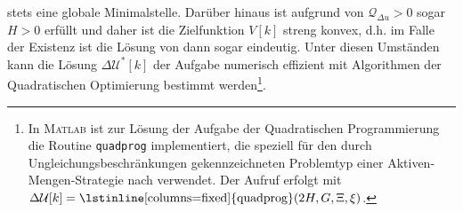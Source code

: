 stets eine globale Minimalstelle. Darüber hinaus ist aufgrund von $\mathcal{Q}_{\Delta u}>0$ sogar $H>0$ erfüllt und daher ist die Zielfunktion $V[k]$
streng konvex, d.h. im Falle der Existenz ist die Lösung von  dann sogar eindeutig. Unter diesen Umständen kann die Lösung $\Delta\mathcal{U}^{\ast}[k]$
der Aufgabe  numerisch effizient mit Algorithmen der Quadratischen Optimierung bestimmt werden\footnote{In \textsc{Matlab} ist zur Lösung
der Aufgabe der Quadratischen Programmierung die Routine \lstinline[columns=fixed]{quadprog} implementiert, die speziell für den durch Ungleichungsbeschränkungen gekennzeichneten
Problemtyp  einer Aktiven-Mengen-Strategie nach \cite{Gill1981} verwendet. Der Aufruf erfolgt mit
$\Delta\mathcal{U}[k]=\text{\lstinline[columns=fixed]{quadprog}}(2H,G,\Xi,\xi)$.}.

